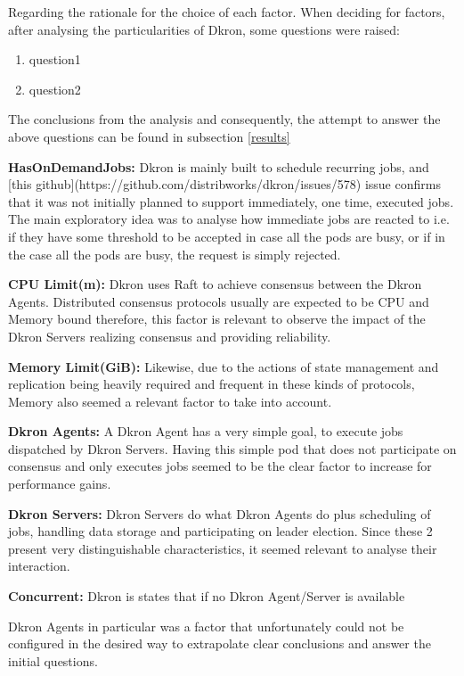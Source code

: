 \documentclass[runningheads]{llncs}
\begin{document}
Regarding the rationale for the choice of each factor. When deciding for factors,
after analysing the particularities of Dkron, some questions were raised:
\begin{enumerate}
    \item question1
    \item question2
\end{enumerate}

The conclusions from the analysis and consequently, the attempt to answer the above questions
can be found in subsection \ref{results}

\par \textbf{HasOnDemandJobs:} Dkron is mainly built to schedule recurring jobs,
and [this github](https://github.com/distribworks/dkron/issues/578) issue confirms that it was not initially planned to support immediately,
one time, executed jobs. The main exploratory idea was to analyse how immediate jobs are reacted to
i.e. if they have some threshold to be accepted in case all the pods are busy, or if in the case
all the pods are busy, the request is simply rejected.
\par \textbf{CPU Limit(m):} Dkron uses Raft to achieve consensus between the Dkron Agents.
Distributed consensus protocols usually are expected to be CPU and Memory bound therefore,
this factor is relevant to observe the impact of the Dkron Servers realizing consensus and
providing reliability.
\par \textbf{Memory Limit(GiB):} Likewise, due to the actions of state management and replication
being heavily required and frequent in these kinds of protocols, Memory also seemed a relevant
factor to take into account.
\par \textbf{Dkron Agents:} A Dkron Agent has a very simple goal, to execute jobs dispatched by
Dkron Servers. Having this simple pod that does not participate on consensus and only executes jobs
seemed to be the clear factor to increase for performance gains.
\par \textbf{Dkron Servers:} Dkron Servers do what Dkron Agents do plus scheduling of jobs,
handling data storage and participating on leader election. Since these 2 present very
distinguishable characteristics, it seemed relevant to analyse their interaction.
\par \textbf{Concurrent:} Dkron is states that if no Dkron Agent/Server is available

Dkron Agents in particular was a factor that unfortunately could not be configured in the
desired way to extrapolate clear conclusions and answer the initial questions.
\end{document}
